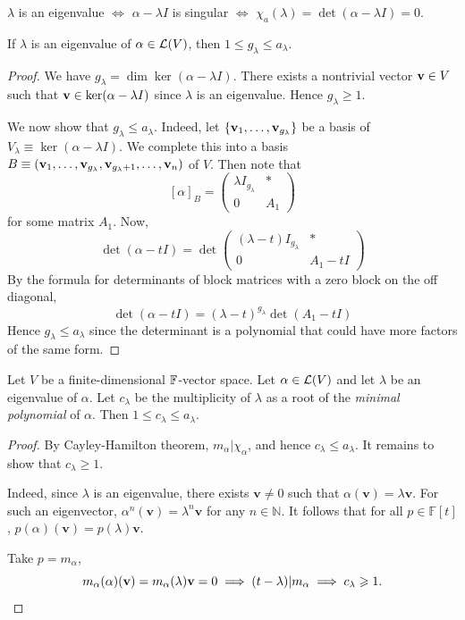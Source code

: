 \documentclass[a4paper]{article}
\begin{document}
\begin{remark}
	$ \lambda $ is an eigenvalue $\iff$ $\alpha-\lambda I$ is singular $\iff$ $\chi_a(\lambda) = \det (\alpha - \lambda I ) = 0$.  
\end{remark}

\begin{lemma}
	If \( \lambda \) is an eigenvalue of \( \alpha \in \mcL(V) \), then \( 1 \leq g_\lambda \leq a_\lambda \).
\end{lemma}
\begin{proof}
	We have \( g_\lambda = \dim \ker (\alpha - \lambda I) \).
	There exists a nontrivial vector \( \bfv \in V \) such that \( \bfv \in \ker(\alpha - \lambda I) \) since \( \lambda \) is an eigenvalue.
	Hence \( g_\lambda \geq 1 \).

	We now show that \( g_\lambda \leq a_\lambda \).
	Indeed, let \( \{\bfv_1, \dots, \bfv_{g_\lambda}\} \) be a basis of \( V_\lambda \equiv \ker (\alpha - \lambda I) \).
	We complete this into a basis \( B \equiv \qty(\bfv_1, \dots, \bfv_{g_\lambda}, \bfv_{g_\lambda + 1}, \dots, \bfv_n) \) of \( V \).
	Then note that
	\[
		[\alpha]_B = \begin{pmatrix}
			\lambda I_{g_\lambda} & * \\
			0                     & A_1
		\end{pmatrix}
	\]
	for some matrix \( A_1 \).
	Now,
	\[
		\det (\alpha - tI) = \det \begin{pmatrix}
			(\lambda - t) I_{g_\lambda} & *     \\
			0                           & A_1 - t I
		\end{pmatrix}
	\]
	By the formula for determinants of block matrices with a zero block on the off diagonal,
	\[
		\det (\alpha - tI) = (\lambda-t)^{g_\lambda} \det(A_1 - t I)
	\]
	Hence \( g_\lambda \leq a_\lambda \) since the determinant is a polynomial that could have more factors of the same form.
\end{proof}

\begin{lemma}
	Let \( V \) be a finite-dimensional \( \bbF \)-vector space.
	Let \( \alpha \in \mcL(V) \) and let \( \lambda \) be an eigenvalue of \( \alpha \).
	Let \( c_\lambda \) be the multiplicity of \( \lambda \) as a root of the \textit{minimal polynomial} of \( \alpha \).
	Then \( 1 \leq c_\lambda \leq a_\lambda \).
\end{lemma}
\begin{proof}
	By Cayley-Hamilton theorem, $ m_\alpha | \chi_\alpha $, and hence $ c_\lambda \le a_\lambda $. It remains to show that $ c_\lambda\ge 1 $. 
	
	Indeed, since $ \lambda $ is an eigenvalue, there exists $ \mathbf{v}\neq 0 $ such that $ \alpha(\mathbf{v}) = \lambda \mathbf{v} $. For such an eigenvector, $ \alpha^n (\mathbf{v}) = \lambda^n \mathbf{v} $ for any $ n \in \mathbb{N} $. 
	It follows that for all $ p\in \mathbb{F}[t] $, $ p(\alpha)(\mathbf{v}) = p(\lambda)\mathbf{v} $. 

	Take $p = m_\alpha$, 
	\[
		m_\alpha(\alpha)(\mathbf{v}) = m_\alpha(\lambda) \mathbf{v} = 0 \implies (t-\lambda) | m_\alpha \implies c_\lambda\ge 1. \qedhere
	\]
\end{proof}
\end{document}
